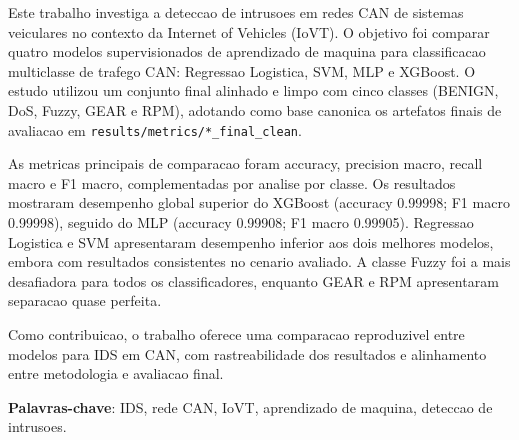 
\setlength{\absparsep}{18pt} %

\begin{resumo}
Este trabalho investiga a deteccao de intrusoes em redes CAN de sistemas veiculares no contexto da Internet of Vehicles (IoVT). O objetivo foi comparar quatro modelos supervisionados de aprendizado de maquina para classificacao multiclasse de trafego CAN: Regressao Logistica, SVM, MLP e XGBoost. O estudo utilizou um conjunto final alinhado e limpo com cinco classes (BENIGN, DoS, Fuzzy, GEAR e RPM), adotando como base canonica os artefatos finais de avaliacao em \texttt{results/metrics/*\_final\_clean}.

As metricas principais de comparacao foram accuracy, precision macro, recall macro e F1 macro, complementadas por analise por classe. Os resultados mostraram desempenho global superior do XGBoost (accuracy 0.99998; F1 macro 0.99998), seguido do MLP (accuracy 0.99908; F1 macro 0.99905). Regressao Logistica e SVM apresentaram desempenho inferior aos dois melhores modelos, embora com resultados consistentes no cenario avaliado. A classe Fuzzy foi a mais desafiadora para todos os classificadores, enquanto GEAR e RPM apresentaram separacao quase perfeita.

Como contribuicao, o trabalho oferece uma comparacao reproduzivel entre modelos para IDS em CAN, com rastreabilidade dos resultados e alinhamento entre metodologia e avaliacao final.


 \textbf{Palavras-chave}: IDS, rede CAN, IoVT, aprendizado de maquina, deteccao de intrusoes.
\end{resumo}

